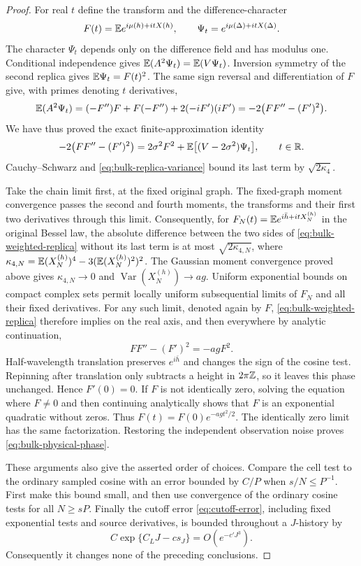 \begin{proof}
For real $t$ define the transform and the difference-character
\[
 F(t)=\mathbb E e^{i\mu(h)+itX(h)},\qquad
 \Psi_t= e^{i\mu(\Delta)+itX(\Delta)}.
\]
The character $\Psi_t$ depends only on the difference field and
has modulus one.  Conditional independence gives
$\mathbb E(A^2\Psi_t)=\mathbb E(V\Psi_t)$.  Inversion symmetry of the second
replica gives $\mathbb E\Psi_t=F(t)^2$.  The same sign reversal and
differentiation of $F$ give, with primes denoting $t$ derivatives,
\[
 \mathbb E(A^2\Psi_t)
 =(-F'')F+F(-F'')+2(-iF')(iF')
 =-2\bigl(FF''-(F')^2\bigr).
\]
We have thus proved the exact finite-approximation identity
\begin{equation}\label{eq:bulk-weighted-replica}
 -2\bigl(FF''-(F')^2\bigr)
 =2\sigma^2F^2+
   \mathbb E\bigl[(V-2\sigma^2)\Psi_t\bigr],
 \qquad t\in\mathbb R.
\end{equation}
Cauchy--Schwarz and \eqref{eq:bulk-replica-variance} bound its
last term by $\sqrt{2\kappa_4}$.

Take the chain limit first, at the fixed original graph.  The
fixed-graph moment convergence passes the second and fourth
moments, the transforms and their first two derivatives through
this limit.  Consequently, for
$F_N(t)=\mathbb E e^{i\bar h+itX_N^{(h)}}$ in the original Bessel law,
the absolute difference between the two sides of
\eqref{eq:bulk-weighted-replica} without its last term is at most
$\sqrt{2\kappa_{4,N}}$, where
$\kappa_{4,N}=\mathbb E(X_N^{(h)})^4-3(\mathbb E(X_N^{(h)})^2)^2$.
The Gaussian moment convergence proved above gives
$\kappa_{4,N}\to0$ and
$\operatorname{Var}(X_N^{(h)})\to ag$.
Uniform exponential bounds on compact complex sets permit
locally uniform subsequential limits of $F_N$ and all their
fixed derivatives.  For any such limit, denoted again by $F$,
\eqref{eq:bulk-weighted-replica} therefore implies on the real
axis, and then everywhere by analytic continuation,
\begin{equation}\label{eq:bulk-replica-ode}
 FF''-(F')^2=-agF^2.
\end{equation}
Half-wavelength translation preserves $e^{i\bar h}$ and changes
the sign of the cosine test.  Repinning after translation only
subtracts a height in $2\pi\mathbb Z$, so it leaves this phase unchanged.
Hence $F'(0)=0$.  If $F$ is not identically zero, solving the equation
where $F\ne0$ and then continuing analytically shows that $F$ is
an exponential quadratic without zeros.  Thus
$F(t)=F(0)e^{-agt^2/2}$.  The identically zero limit has the same
factorization.  Restoring the independent observation noise proves
\eqref{eq:bulk-physical-phase}.

These arguments also give the asserted order of choices.  Compare
the cell test to the ordinary sampled cosine with an error bounded
by $C/P$ when $s/N\le P^{-1}$.  First make this bound small, and
then use convergence of the ordinary cosine tests for all
$N\ge sP$.  Finally the cutoff error
\eqref{eq:cutoff-error}, including fixed exponential tests and
source derivatives, is bounded throughout a $J$-history by
\[
 C\exp\{C_LJ-cs_J\}=O(e^{-c'J^3}).
\]
Consequently it changes none of the preceding conclusions.
\end{proof}

